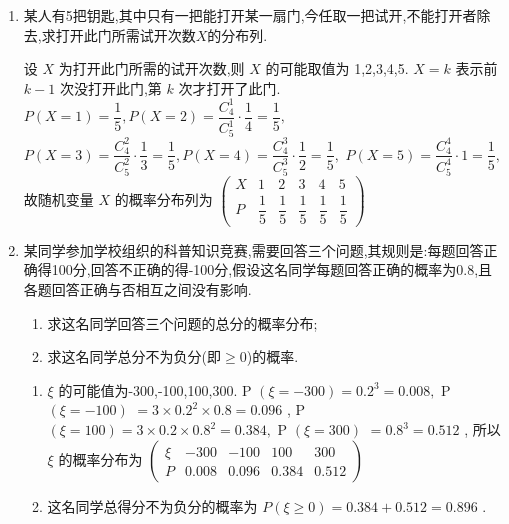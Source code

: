 \begin{enumerate}
\item 某人有5把钥匙,其中只有一把能打开某一扇门,今任取一把试开,不能打开者除去,求打开此门所需试开次数$X$的分布列.
\begin{jieda}
    设 $X$ 为打开此门所需的试开次数,则 $X$ 的可能取值为
1,2,3,4,5.
$X = k$ 表示前 $k - 1$ 次没打开此门,第 $k$ 次才打开了此门.
$P\left( {X = 1}\right)  = \dfrac{1}{5},P\left( {X = 2}\right)  = \dfrac{{{C}}_{4}^{1}}{{{C}}_{5}^{1}} \cdot  \dfrac{1}{4} = \dfrac{1}{5},$
$P\left( {X = 3}\right)  = \dfrac{{{C}}_{4}^{2}}{{{C}}_{5}^{2}} \cdot  \dfrac{1}{3} = \dfrac{1}{5},P\left( {X = 4}\right)  = \dfrac{{{C}}_{4}^{3}}{{{C}}_{5}^{3}} \cdot  \dfrac{1}{2} = \dfrac{1}{5},$
$P\left( {X = 5}\right)  = \dfrac{{{C}}_{4}^{4}}{{{C}}_{5}^{4}} \cdot  1 = \dfrac{1}{5},$
故随机变量 $X$ 的概率分布列为
$\begin{pmatrix}
    X & 1& 2& 3& 4& 5\\
    P & \dfrac{1}{5} & \dfrac{1}{5} & \dfrac{1}{5} & \dfrac{1}{5} & \dfrac{1}{5}
\end{pmatrix}$
\end{jieda}

\item 某同学参加学校组织的科普知识竞赛,需要回答三个问题,其规则是:每题回答正确得100分,回答不正确的得-100分,假设这名同学每题回答正确的概率为0.8,且各题回答正确与否相互之间没有影响.
\begin{enumerate}
\item 求这名同学回答三个问题的总分的概率分布;
\item 求这名同学总分不为负分(即$\ge0$)的概率.
\end{enumerate}
\begin{jieda}
    \begin{enumerate}
    \item $\xi$ 的可能值为-300,-100,100,300.
P $\left( {\xi  =  - {300}}\right)  = {0.2}^{3} = {0.008},$ P $\left( {\xi  =  - {100}}\right)$
$= 3 \times  {0.2}^{2} \times  {0.8} = {0.096}$ ,
P $\left( {\xi  = {100}}\right)  = 3 \times  {0.2} \times  {0.8}^{2} = {0.384},$ P $\left( {\xi  = {300}}\right)$
$= {0.8}^{3} = {0.512}$ ,
所以 $\xi$ 的概率分布为
$\begin{pmatrix}
    ξ& -300& -100& 100 &300\\
    P & 0.008 & 0.096 & 0.384 &0.512
\end{pmatrix}$
    \item 这名同学总得分不为负分的概率为 ${P}\left( {\xi  \geq  0}\right)$$= {0.384} + {0.512} = {0.896}$ .
    \end{enumerate}
\end{jieda}


\end{enumerate}
